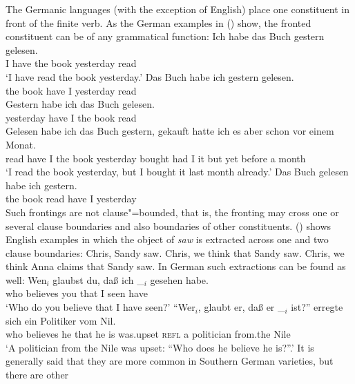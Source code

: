 The Germanic languages (with the exception of English) place one constituent in front of the finite
verb. As the German examples in () show, the fronted constituent can be of any grammatical function:
\eal
\ex 
\gll Ich habe das Buch gestern gelesen.\\
     I have the book yesterday read\\\german
\glt `I have read the book yesterday.'
\ex 
\gll Das Buch habe ich gestern gelesen.\\
     the book have I yesterday read\\
\ex 
\gll Gestern habe ich das Buch gelesen.\\
     yesterday have I the book read\\
\ex 
\gll Gelesen habe ich das Buch gestern, gekauft hatte ich es aber schon vor einem Monat.\\
     read have I the book yesterday bought had I it but yet before a month\\
\glt `I read the book yesterday, but I bought it last month already.'
\ex 
\gll Das Buch gelesen habe ich gestern.\\
     the book read    have I yesterday\\
\zl
Such frontings are not clause"=bounded, that is, the fronting may cross one or several clause boundaries
and also boundaries of other constituents. () shows English examples in which the object of
\emph{saw} is extracted across one and two clause boundaries:
\eal
\ex\label{ex-chris-we-saw} Chris, Sandy saw.
\ex\label{ex-chris-we-think-that-sandy-saw} Chris, we think that Sandy saw.
\ex Chris, we think Anna claims that Sandy saw.
\zl
In German such extractions can be found as well:
\eal
\label{ex-fernabhaengigkeit-one}
\ex
\label{ex-wen-glaubst-du-dass}
\gll Wen$_i$ glaubst du, daß ich \_$_i$ gesehen habe.\footnotemark\\
     who believes you that I {} seen have\\\german
{}
\glt `Who do you believe that I have seen?'
\ex 
\gll "`Wer$_i$, glaubt er, daß er \_$_i$ ist?"' erregte sich ein Politiker vom Nil.\footnotemark\\
     \hphantom{"`}who believes he that he {} is was.upset \textsc{refl} a politician from.the Nile\\
\glt `A politician from the Nile was upset: ``Who does he believe he is?''.'
\zl
It is generally said that they are more common in Southern German varieties, but there are other
